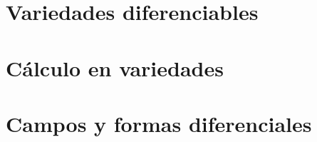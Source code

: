 \documentclass[12pt]{article}
\begin{document}
\section{Variedades diferenciables}
\section{Cálculo en variedades}
\section{Campos y formas diferenciales}
\end{document}
